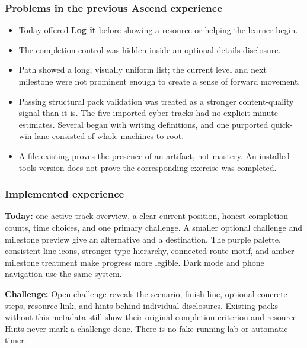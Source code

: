 \hypertarget{problems-in-the-previous-ascend-experience}{%
\subsubsection{Problems in the previous Ascend
experience}\label{problems-in-the-previous-ascend-experience}}

\begin{itemize}
\tightlist
\item
  Today offered \textbf{Log it} before showing a resource or helping the
  learner begin.
\item
  The completion control was hidden inside an optional-details
  disclosure.
\item
  Path showed a long, visually uniform list; the current level and next
  milestone were not prominent enough to create a sense of forward
  movement.
\item
  Passing structural pack validation was treated as a stronger
  content-quality signal than it is. The five imported cyber tracks had
  no explicit minute estimates. Several began with writing definitions,
  and one purported quick-win lane consisted of whole machines to root.
\item
  A file existing proves the presence of an artifact, not mastery. An
  installed tool\textquotesingle s version does not prove the
  corresponding exercise was completed.
\end{itemize}

\hypertarget{implemented-experience}{%
\subsubsection{Implemented experience}\label{implemented-experience}}

\textbf{Today:} one active-track overview, a clear current position,
honest completion counts, time choices, and one primary challenge. A
smaller optional challenge and milestone preview give an alternative and
a destination. The purple palette, consistent line icons, stronger type
hierarchy, connected route motif, and amber milestone treatment make
progress more legible. Dark mode and phone navigation use the same
system.

\textbf{Challenge:} Open challenge reveals the scenario, finish line,
optional concrete steps, resource link, and hints behind individual
disclosures. Existing packs without this metadata still show their
original completion criterion and resource. Hints never mark a challenge
done. There is no fake running lab or automatic timer.

